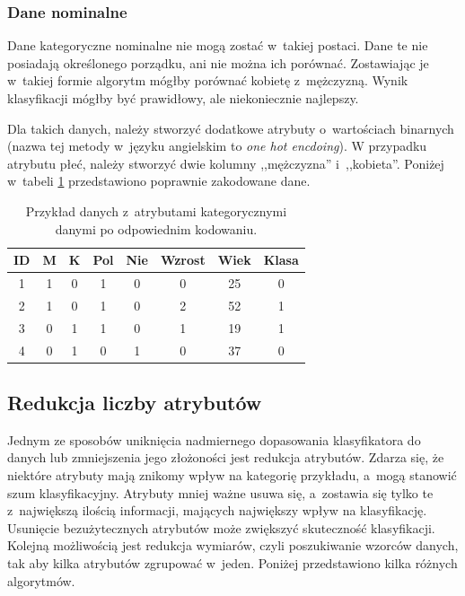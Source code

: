\subsubsection{Dane nominalne}
Dane kategoryczne nominalne nie mogą zostać w~takiej postaci. Dane te nie posiadają określonego porządku, ani nie można ich porównać. Zostawiając je w~takiej formie algorytm mógłby porównać kobietę z~mężczyzną. Wynik klasyfikacji mógłby być prawidłowy, ale niekoniecznie najlepszy. \par
Dla takich danych, należy stworzyć dodatkowe atrybuty o~wartościach binarnych (nazwa tej metody w~języku angielskim to \textit{one hot encdoing}). W przypadku atrybutu płeć, należy stworzyć dwie kolumny ,,mężczyzna'' i~,,kobieta''. Poniżej w~tabeli \ref{danekategoryczne2} przedstawiono poprawnie zakodowane dane.
\begin{table}[H]
	\begin{center}
			\begin{tabular}{cccccccc}	
				{\bf ID} & {\bf M } & {\bf K } & {\bf Pol} & {\bf Nie} & {\bf Wzrost } & {\bf Wiek} & {\bf Klasa } \\
				\hline 
				1 & 1 & 0& 1 & 0 & 0 & 25 & 0 \\
				2 & 1 & 0& 1 & 0 & 2 & 52 & 1 \\
				3 & 0 & 1& 1 & 0 & 1 & 19 & 1 \\
				4 & 0 & 1& 0 & 1 & 0 & 37 & 0 \\
			\end{tabular}
			\caption[Przykład danych z~atrybutami kategorycznymi]{Przykład danych z~atrybutami kategorycznymi danymi po odpowiednim kodowaniu.}
			\label{danekategoryczne2}
		\end{center}
	\end{table}
\subsection{Redukcja liczby atrybutów}
Jednym ze sposobów uniknięcia nadmiernego dopasowania klasyfikatora do danych lub zmniejszenia jego złożoności jest redukcja atrybutów. Zdarza się, że niektóre atrybuty mają znikomy wpływ na kategorię przykładu, a~mogą stanowić szum klasyfikacyjny. Atrybuty mniej ważne usuwa się, a~zostawia się tylko te z~największą ilością informacji, mających największy wpływ na klasyfikację. Usunięcie bezużytecznych atrybutów może zwiększyć skuteczność klasyfikacji. Kolejną możliwością jest redukcja wymiarów, czyli poszukiwanie wzorców danych, tak aby kilka atrybutów zgrupować w~jeden. Poniżej przedstawiono kilka różnych algorytmów.
